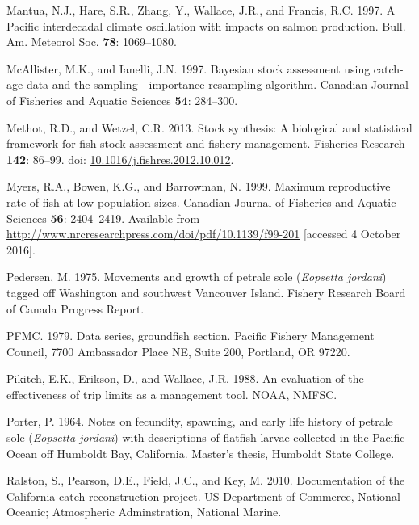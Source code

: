 \documentclass[12pt,]{article}
\begin{document}
\hypertarget{ref-mantua_pacific_1997}{}
Mantua, N.J., Hare, S.R., Zhang, Y., Wallace, J.R., and Francis, R.C.
1997. A Pacific interdecadal climate oscillation with impacts on salmon
production. Bull. Am. Meteorol Soc. \textbf{78}: 1069--1080.

\hypertarget{ref-mcallister_bayesian_1997}{}
McAllister, M.K., and Ianelli, J.N. 1997. Bayesian stock assessment
using catch-age data and the sampling - importance resampling algorithm.
Canadian Journal of Fisheries and Aquatic Sciences \textbf{54}:
284--300.

\hypertarget{ref-methot_stock_2013}{}
Methot, R.D., and Wetzel, C.R. 2013. Stock synthesis: A biological and
statistical framework for fish stock assessment and fishery management.
Fisheries Research \textbf{142}: 86--99. doi:
\href{https://doi.org/10.1016/j.fishres.2012.10.012}{10.1016/j.fishres.2012.10.012}.

\hypertarget{ref-myers_maximum_1999}{}
Myers, R.A., Bowen, K.G., and Barrowman, N. 1999. Maximum reproductive
rate of fish at low population sizes. Canadian Journal of Fisheries and
Aquatic Sciences \textbf{56}: 2404--2419. Available from
\url{http://www.nrcresearchpress.com/doi/pdf/10.1139/f99-201}
{[}accessed 4 October 2016{]}.

\hypertarget{ref-pedersen_movements_1975}{}
Pedersen, M. 1975. Movements and growth of petrale sole (\emph{Eopsetta
jordani}) tagged off Washington and southwest Vancouver Island. Fishery
Research Board of Canada Progress Report.

\hypertarget{ref-pfmc_data_1979}{}
PFMC. 1979. Data series, groundfish section. Pacific Fishery Management
Council, 7700 Ambassador Place NE, Suite 200, Portland, OR 97220.

\hypertarget{ref-pikitch_evaluation_1988}{}
Pikitch, E.K., Erikson, D., and Wallace, J.R. 1988. An evaluation of the
effectiveness of trip limits as a management tool. NOAA, NMFSC.

\hypertarget{ref-porter_notes_1964}{}
Porter, P. 1964. Notes on fecundity, spawning, and early life history of
petrale sole (\emph{Eopsetta jordani}) with descriptions of flatfish
larvae collected in the Pacific Ocean off Humboldt Bay, California.
Master's thesis, Humboldt State College.

\hypertarget{ref-ralston_documentation_2010}{}
Ralston, S., Pearson, D.E., Field, J.C., and Key, M. 2010. Documentation
of the California catch reconstruction project. US Department of
Commerce, National Oceanic; Atmospheric Adminstration, National Marine.
\end{document}
